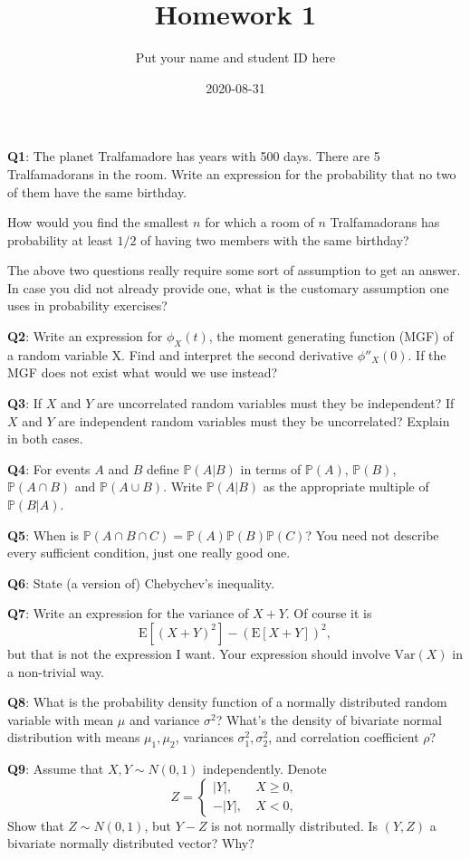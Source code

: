\documentclass[]{article}
\title{Homework 1}
\author{Put your name and student ID here}
\date{2020-08-31}
\begin{document}
\maketitle

\textbf{Q1}: The planet Tralfamadore has years with 500 days. There are
5 Tralfamadorans in the room. Write an expression for the probability
that no two of them have the same birthday.

How would you find the smallest \(n\) for which a room of \(n\)
Tralfamadorans has probability at least \(1/2\) of having two members
with the same birthday?

The above two questions really require some sort of assumption to get an
answer. In case you did not already provide one, what is the customary
assumption one uses in probability exercises?

\textbf{Q2}: Write an expression for \(\phi_X(t)\), the moment
generating function (MGF) of a random variable X. Find and interpret the
second derivative \(\phi{''}_X(0)\). If the MGF does not exist what
would we use instead?

\textbf{Q3}: If \(X\) and \(Y\) are uncorrelated random variables must
they be independent? If \(X\) and \(Y\) are independent random variables
must they be uncorrelated? Explain in both cases.

\textbf{Q4}: For events \(A\) and \(B\) define \(\mathbb{P}(A|B)\) in
terms of \(\mathbb{P}(A)\), \(\mathbb{P}(B)\), \(\mathbb{P}(A \cap B)\)
and \(\mathbb{P}(A\cup B)\). Write \(\mathbb{P}(A|B)\) as the
appropriate multiple of \(\mathbb{P}(B|A)\).

\textbf{Q5}: When is
\(\mathbb{P}(A\cap B \cap C)=\mathbb{P}(A)\mathbb{P}(B)\mathbb{P}(C)\)?
You need not describe every sufficient condition, just one really good
one.

\textbf{Q6}: State (a version of) Chebychev's inequality.

\textbf{Q7}: Write an expression for the variance of \(X + Y\). Of
course it is \[\mathrm{E}[(X+Y)^2]-(\mathrm{E}[X+Y])^2,\] but that is
not the expression I want. Your expression should involve
\(\mathrm{Var}(X)\) in a non-trivial way.

\textbf{Q8}: What is the probability density function of a normally
distributed random variable with mean \(\mu\) and variance \(\sigma^2\)?
What's the density of bivariate normal distribution with means
\(\mu_1,\mu_2\), variances \(\sigma_1^2,\sigma_2^2\), and correlation
coefficient \(\rho\)?

\textbf{Q9}: Assume that \(X,Y\sim N(0,1)\) independently. Denote
\[Z=\begin{cases}
|Y|,\ &X\ge 0,\\
-|Y|,\ &X<0,
\end{cases}\] Show that \(Z\sim N(0,1)\), but \(Y-Z\) is not normally
distributed. Is \((Y,Z)\) a bivariate normally distributed vector? Why?
\end{document}

